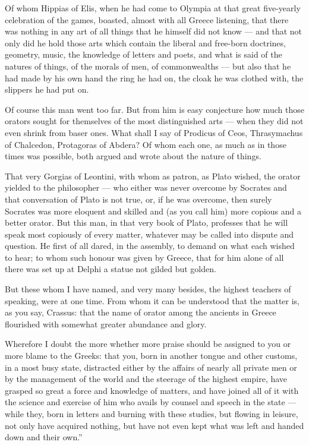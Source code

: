  Of whom Hippias of Elis, when he had come to Olympia at that great five-yearly celebration of the games, boasted, almost with all Greece listening, that there was nothing in any art of all things that he himself did not know — and that not only did he hold those arts which contain the liberal and free-born doctrines, geometry, music, the knowledge of letters and poets, and what is said of the natures of things, of the morals of men, of commonwealths — but also that he had made by his own hand the ring he had on, the cloak he was clothed with, the slippers he had put on.

 Of course this man went too far. But from him is easy conjecture how much those orators sought for themselves of the most distinguished arts — when they did not even shrink from baser ones. What shall I say of Prodicus of Ceos, Thrasymachus of Chalcedon, Protagoras of Abdera? Of whom each one, as much as in those times was possible, both argued and wrote about the nature of things.

 That very Gorgias of Leontini, with whom as patron, as Plato wished, the orator yielded to the philosopher — who either was never overcome by Socrates and that conversation of Plato is not true, or, if he was overcome, then surely Socrates was more eloquent and skilled and (as you call him) more copious and a better orator. But this man, in that very book of Plato, professes that he will speak most copiously of every matter, whatever may be called into dispute and question. He first of all dared, in the assembly, to demand on what each wished to hear; to whom such honour was given by Greece, that for him alone of all there was set up at Delphi a statue not gilded but golden.

 But these whom I have named, and very many besides, the highest teachers of speaking, were at one time. From whom it can be understood that the matter is, as you say, Crassus: that the name of orator among the ancients in Greece flourished with somewhat greater abundance and glory.

 Wherefore I doubt the more whether more praise should be assigned to you or more blame to the Greeks: that you, born in another tongue and other customs, in a most busy state, distracted either by the affairs of nearly all private men or by the management of the world and the steerage of the highest empire, have grasped so great a force and knowledge of matters, and have joined all of it with the science and exercise of him who avails by counsel and speech in the state — while they, born in letters and burning with these studies, but flowing in leisure, not only have acquired nothing, but have not even kept what was left and handed down and their own.''

